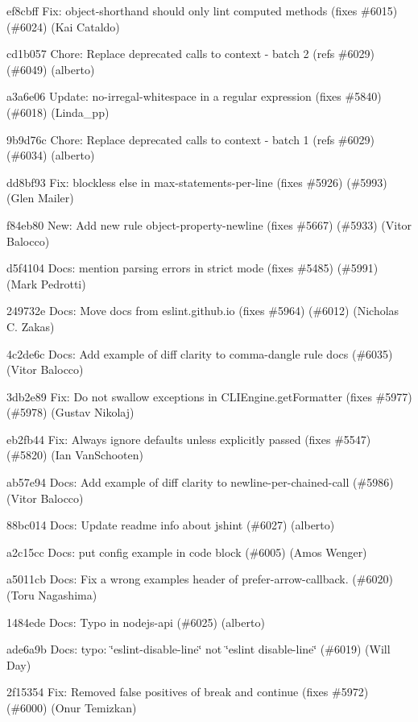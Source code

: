 \begin{DoxyItemize}
\item ef8cbff Fix\+: object-\/shorthand should only lint computed methods (fixes \#6015) (\#6024) (Kai Cataldo)
\item cd1b057 Chore\+: Replace deprecated calls to context -\/ batch 2 (refs \#6029) (\#6049) (alberto)
\item a3a6e06 Update\+: no-\/irregal-\/whitespace in a regular expression (fixes \#5840) (\#6018) (Linda\+\_\+pp)
\item 9b9d76c Chore\+: Replace deprecated calls to context -\/ batch 1 (refs \#6029) (\#6034) (alberto)
\item dd8bf93 Fix\+: blockless else in max-\/statements-\/per-\/line (fixes \#5926) (\#5993) (Glen Mailer)
\item f84eb80 New\+: Add new rule {\ttfamily object-\/property-\/newline} (fixes \#5667) (\#5933) (Vitor Balocco)
\item d5f4104 Docs\+: mention parsing errors in strict mode (fixes \#5485) (\#5991) (Mark Pedrotti)
\item 249732e Docs\+: Move docs from eslint.\+github.\+io (fixes \#5964) (\#6012) (Nicholas C. Zakas)
\item 4c2de6c Docs\+: Add example of diff clarity to comma-\/dangle rule docs (\#6035) (Vitor Balocco)
\item 3db2e89 Fix\+: Do not swallow exceptions in C\+L\+I\+Engine.\+get\+Formatter (fixes \#5977) (\#5978) (Gustav Nikolaj)
\item eb2fb44 Fix\+: Always ignore defaults unless explicitly passed (fixes \#5547) (\#5820) (Ian Van\+Schooten)
\item ab57e94 Docs\+: Add example of diff clarity to newline-\/per-\/chained-\/call (\#5986) (Vitor Balocco)
\item 88bc014 Docs\+: Update readme info about jshint (\#6027) (alberto)
\item a2c15cc Docs\+: put config example in code block (\#6005) (Amos Wenger)
\item a5011cb Docs\+: Fix a wrong examples\textquotesingle{} header of {\ttfamily prefer-\/arrow-\/callback}. (\#6020) (Toru Nagashima)
\item 1484ede Docs\+: Typo in nodejs-\/api (\#6025) (alberto)
\item ade6a9b Docs\+: typo\+: \char`\"{}eslint-\/disable-\/line\char`\"{} not \char`\"{}eslint disable-\/line\char`\"{} (\#6019) (Will Day)
\item 2f15354 Fix\+: Removed false positives of break and continue (fixes \#5972) (\#6000) (Onur Temizkan)
\end{DoxyItemize}

